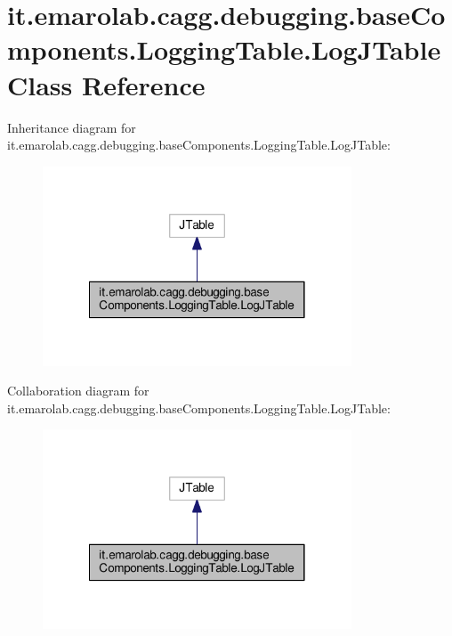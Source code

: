 \hypertarget{classit_1_1emarolab_1_1cagg_1_1debugging_1_1baseComponents_1_1LoggingTable_1_1LogJTable}{\section{it.\-emarolab.\-cagg.\-debugging.\-base\-Components.\-Logging\-Table.\-Log\-J\-Table Class Reference}
\label{classit_1_1emarolab_1_1cagg_1_1debugging_1_1baseComponents_1_1LoggingTable_1_1LogJTable}
}


Inheritance diagram for it.\-emarolab.\-cagg.\-debugging.\-base\-Components.\-Logging\-Table.\-Log\-J\-Table\-:\nopagebreak
\begin{figure}[H]
\begin{center}
\leavevmode
\includegraphics[width=260pt]{classit_1_1emarolab_1_1cagg_1_1debugging_1_1baseComponents_1_1LoggingTable_1_1LogJTable__inherit__graph}
\end{center}
\end{figure}


Collaboration diagram for it.\-emarolab.\-cagg.\-debugging.\-base\-Components.\-Logging\-Table.\-Log\-J\-Table\-:\nopagebreak
\begin{figure}[H]
\begin{center}
\leavevmode
\includegraphics[width=260pt]{classit_1_1emarolab_1_1cagg_1_1debugging_1_1baseComponents_1_1LoggingTable_1_1LogJTable__coll__graph}
\end{center}
\end{figure}

